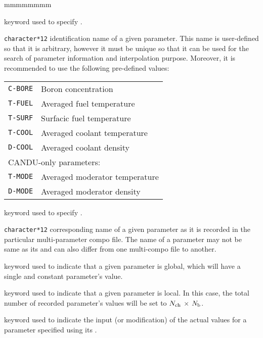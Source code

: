 \begin{ListeDeDescription}{mmmmmmmm}
\item[\moc{PNAME}] keyword used to specify .

\item[\dusa{PNAME}] \texttt{character*12} identification name of a given
parameter. This name is user-defined so that it is arbitrary, however
it must be unique so that it can be used for the search of parameter information
and interpolation purpose. Moreover, it is recommended to use the following pre-defined
values:

\begin{tabular}{|c|l|}
\hline
{\tt C-BORE} & Boron concentration \\
{\tt T-FUEL} & Averaged fuel temperature \\
{\tt T-SURF} & Surfacic fuel temperature \\
{\tt T-COOL} & Averaged coolant temperature \\
{\tt D-COOL} & Averaged coolant density \\
\hline
\multicolumn{2}{|l|}{CANDU-only parameters:} \\
\hline
{\tt T-MODE} & Averaged moderator temperature\\
{\tt D-MODE} & Averaged moderator density \\
\hline
\end{tabular}

\item[\moc{PARKEY}] keyword used to specify .

\item[\dusa{PARKEY}] \texttt{character*12} corresponding name of a given
parameter as it is recorded in the particular multi-parameter compo file. The
 name of a parameter may not be same as its 
and can also differ from one multi-compo file to another.

\item[\moc{GLOBAL}] keyword used to indicate that a given parameter is global,
which will have a single and constant parameter's value.

\item[\moc{LOCAL}] keyword used to indicate that a given parameter
is local. In this case, the total number of recorded parameter's values will
be set to $N_{\rm ch}$ $\times$ $N_{\rm b}$.

\item[\moc{SET-PARAM}] keyword used to indicate the input (or modification)
of the actual values for a parameter specified using its .


\end{ListeDeDescription}
